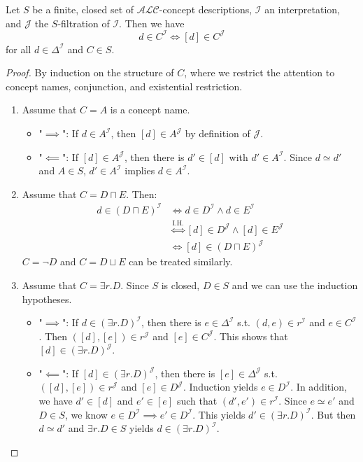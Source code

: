 \begin{lemma} \label{lem:filtration invariance}
	Let $S$ be a finite, closed set of $\mathcal{ALC}$-concept descriptions,
	$\mathcal{I}$ an interpretation, and $\mathcal{J}$ the $S$-filtration of $\mathcal{I}$.
	Then we have
	\[
		d \in C^{\mathcal{I}} \iff [d] \in C^{\mathcal{J}}
	\]
	for all $d \in \Delta^{\mathcal{I}}$ and $C \in S$.
\end{lemma}
\begin{proof}
	By induction on the structure of $C$,
	where we restrict the attention to concept names, conjunction, and existential restriction.
	\begin{enumerate}
		\item Assume that $C=A$ is a concept name.
			\begin{itemize}
				\item "$\implies$": If $d \in A^{\mathcal{I}}$, then $[d] \in A^{\mathcal{J}}$ by definition of $\mathcal{J}$.
				\item "$\impliedby$": If $\left[ d \right] \in A^{\mathcal{J}}$, then there is $d' \in [d]$ with $d' \in A^{\mathcal{I}}$.
					Since $d \simeq d'$ and $A \in S$, $d' \in A^{\mathcal{I}}$ implies $d \in A^{\mathcal{I}}$.
			\end{itemize}
		\item Assume that $C = D \sqcap E$. Then:
			\begin{align*}
				d \in (D \sqcap E)^{\mathcal{I}} &\iff d \in D^\mathcal{I} \land d \in E^{\mathcal{I}} \\
												 &\stackrel{\text{I.H.}}{\iff} [d] \in D^{\mathcal{J}} \land [d] \in E^{\mathcal{J}} \\
												 &\iff [d] \in (D \sqcap E)^{\mathcal{J}}
			\end{align*}
			$C = \neg D$ and $C = D \sqcup E$ can be treated similarly.
		\item Assume that $C = \exists r.D$.
			Since $S$ is closed, $D \in S$ and we can use the induction hypotheses.
			\begin{itemize}
				\item "$\implies$": If $d \in (\exists r.D)^{\mathcal{I}}$, then there is $e \in \Delta^{\mathcal{I}}$ s.t. $(d,e) \in r^{\mathcal{I}}$ and $e \in C^{\mathcal{I}}$.
					Then $([d],[e]) \in r^{\mathcal{J}}$ and $[e] \in C^\mathcal{J}$.
					This shows that $[d] \in (\exists r.D)^\mathcal{J}$.
				\item "$\impliedby$": If $[d] \in (\exists r.D)^{\mathcal{J}}$, then there is $[e] \in \Delta^{\mathcal{J}}$ s.t. $([d],[e]) \in r^{\mathcal{J}}$ and $[e] \in D^{\mathcal{J}}$.
					Induction yields $e \in D^\mathcal{I}$.
					In addition, we have $d' \in [d]$ and $e' \in [e]$ such that $(d', e') \in r^{\mathcal{I}}$.
					Since $e \simeq e'$ and  $D \in S$, we know $e \in D^{\mathcal{I}} \implies e' \in D^{\mathcal{I}}$.
					This yields $d' \in \left( \exists r.D \right)^\mathcal{I}$.
					But then $d \simeq d'$ and  $\exists r.D \in S$ yields $d \in \left( \exists r.D \right)^\mathcal{I}$.
					\qedhere
			\end{itemize}
	\end{enumerate}
\end{proof}
